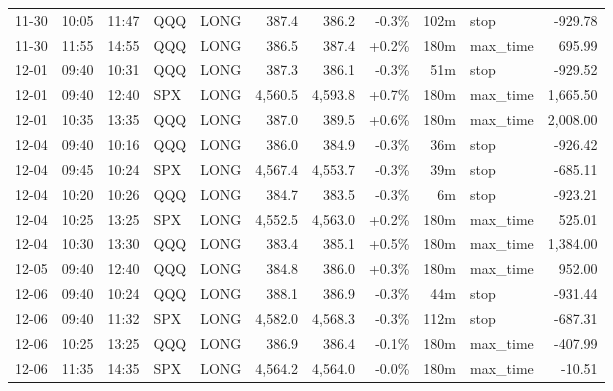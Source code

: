 \documentclass[11pt,a4paper,twoside]{article}
\begin{document}
\begin{center}
\begin{longtable}{>{\color{txtmain}}l l l l l r r r r >{\color{txtmain}}l r}
11-30 & 10:05 & 11:47 & QQQ & LONG & 387.4 & 386.2 & \textcolor{lossred}{-0.3\%} & 102m & stop & \textcolor{lossred}{-929.78} \\
11-30 & 11:55 & 14:55 & QQQ & LONG & 386.5 & 387.4 & \textcolor{wingreen}{+0.2\%} & 180m & max\_time & \textcolor{wingreen}{695.99} \\
12-01 & 09:40 & 10:31 & QQQ & LONG & 387.3 & 386.1 & \textcolor{lossred}{-0.3\%} & 51m & stop & \textcolor{lossred}{-929.52} \\
12-01 & 09:40 & 12:40 & SPX & LONG & 4,560.5 & 4,593.8 & \textcolor{wingreen}{+0.7\%} & 180m & max\_time & \textcolor{wingreen}{1,665.50} \\
12-01 & 10:35 & 13:35 & QQQ & LONG & 387.0 & 389.5 & \textcolor{wingreen}{+0.6\%} & 180m & max\_time & \textcolor{wingreen}{2,008.00} \\
12-04 & 09:40 & 10:16 & QQQ & LONG & 386.0 & 384.9 & \textcolor{lossred}{-0.3\%} & 36m & stop & \textcolor{lossred}{-926.42} \\
12-04 & 09:45 & 10:24 & SPX & LONG & 4,567.4 & 4,553.7 & \textcolor{lossred}{-0.3\%} & 39m & stop & \textcolor{lossred}{-685.11} \\
12-04 & 10:20 & 10:26 & QQQ & LONG & 384.7 & 383.5 & \textcolor{lossred}{-0.3\%} & 6m & stop & \textcolor{lossred}{-923.21} \\
12-04 & 10:25 & 13:25 & SPX & LONG & 4,552.5 & 4,563.0 & \textcolor{wingreen}{+0.2\%} & 180m & max\_time & \textcolor{wingreen}{525.01} \\
12-04 & 10:30 & 13:30 & QQQ & LONG & 383.4 & 385.1 & \textcolor{wingreen}{+0.5\%} & 180m & max\_time & \textcolor{wingreen}{1,384.00} \\
12-05 & 09:40 & 12:40 & QQQ & LONG & 384.8 & 386.0 & \textcolor{wingreen}{+0.3\%} & 180m & max\_time & \textcolor{wingreen}{952.00} \\
12-06 & 09:40 & 10:24 & QQQ & LONG & 388.1 & 386.9 & \textcolor{lossred}{-0.3\%} & 44m & stop & \textcolor{lossred}{-931.44} \\
12-06 & 09:40 & 11:32 & SPX & LONG & 4,582.0 & 4,568.3 & \textcolor{lossred}{-0.3\%} & 112m & stop & \textcolor{lossred}{-687.31} \\
12-06 & 10:25 & 13:25 & QQQ & LONG & 386.9 & 386.4 & \textcolor{lossred}{-0.1\%} & 180m & max\_time & \textcolor{lossred}{-407.99} \\
12-06 & 11:35 & 14:35 & SPX & LONG & 4,564.2 & 4,564.0 & \textcolor{lossred}{-0.0\%} & 180m & max\_time & \textcolor{lossred}{-10.51} \\

\end{longtable}
\end{center}
\end{document}
